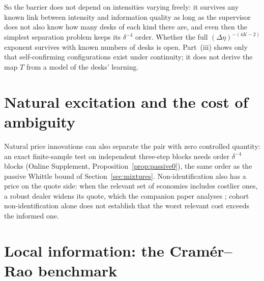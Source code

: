 \documentclass[12pt]{article}
\theoremstyle{definition}
\theoremstyle{remark}
\begin{document}
So the barrier does not depend on intensities varying freely: it survives any known link between intensity and information quality as long as the supervisor does not also know how many desks of each kind there are, and even then the simplest separation problem keeps its $\delta^{-4}$ order. Whether the full $(\Delta\eta)^{-(4K-2)}$ exponent survives with known numbers of desks is open. Part~(iii) shows only that self-confirming configurations exist under continuity; it does not derive the map $T$ from a model of the desks' learning.

\section{Natural excitation and the cost of ambiguity}

Natural price innovations can also separate the pair with zero controlled quantity: an exact finite-sample test on independent three-step blocks needs order $\delta^{-4}$ blocks (Online Supplement, Proposition~\ref{prop:passive0}), the same order as the passive Whittle bound of Section~\ref{sec:mixtures}. Non-identification also has a price on the quote side: when the relevant set of economies includes costlier ones, a robust dealer widens its quote, which the companion paper analyses \citep{niroula2026b}; cohort non-identification alone does not establish that the worst relevant cost exceeds the informed one.
\section{Local information: the Cram\'er--Rao benchmark}
\end{document}
